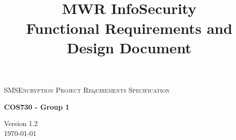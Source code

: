 \begin{titlepage}
\begin{center}

\textsc{\LARGE SMSEncryption Project Requirements Specification}

\textbf{COS730 - Group 1} \\

\title{
  \textbf{\\}
MWR InfoSecurity\\
Functional Requirements and Design Document\\
}

\vfill

{\large Version 1.2}
\\
{\large \today}

\end{center}
\end{titlepage}
